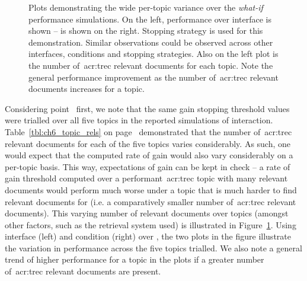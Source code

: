 \begin{figure}[t!]
    \centering
    \caption[Per-topic performance variation example]{Plots demonstrating the wide per-topic variance over the \emph{what-if} performance simulations. On the left, performance over interface  is shown –  is shown on the right. Stopping strategy  is used for this demonstration. Similar observations could be observed across other interfaces, conditions and stopping strategies. Also  on the left plot is the number of~\gls{acr:trec} relevant documents for each topic. Note the general performance improvement as the number of~\gls{acr:trec} relevant documents increases for a topic.}
    \label{fig:per_topic_differences}
\end{figure}

Considering point~ first, we note that the same gain stopping threshold values were trialled over all five topics in the reported simulations of interaction. Table~\ref{tbl:ch6_topic_rels} on page~\pageref{tbl:ch6_topic_rels} demonstrated that the number of~\gls{acr:trec} relevant documents for each of the five topics varies considerably. As such, one would expect that the computed rate of gain would also vary considerably on a per-topic basis. This way, expectations of gain can be kept in check -- a rate of gain threshold computed over a performant~\gls{acr:trec} topic with many relevant documents would perform much worse under a topic that is much harder to find relevant documents for (i.e. a comparatively smaller number of~\gls{acr:trec} relevant documents). This varying number of relevant documents over topics (amongst other factors, such as the retrieval system used) is illustrated in Figure~\ref{fig:per_topic_differences}. Using interface  (left) and condition  (right) over , the two plots in the figure illustrate the variation in performance across the five topics trialled. We also note a general trend of higher performance for a topic in the plots if a greater number of~\gls{acr:trec} relevant documents are present.

